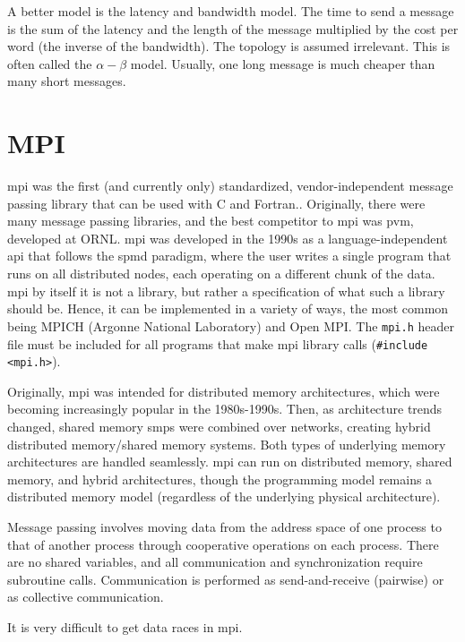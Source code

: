 \documentclass[10pt]{article}
\begin{document}
\begin{flushleft}
A better model is the latency and bandwidth model. The time to send a message is the sum of the latency and the length of the message multiplied by the cost per word (the inverse of the bandwidth). The topology is assumed irrelevant. This is often called the \(\alpha-\beta\) model. Usually, one long message is much cheaper than many short messages. 

\section{MPI}

\gls{mpi} was the first (and currently only) standardized, vendor-independent message passing library that can be used with C and Fortran.. Originally, there were many message passing libraries, and the best competitor to \gls{mpi} was \gls{pvm}, developed at ORNL. \gls{mpi} was developed in the 1990s as a language-independent \gls{api} that follows the \gls{spmd} paradigm, where the user writes a single program that runs on all distributed nodes, each operating on a different chunk of the data. \gls{mpi} by itself it is not a library, but rather a specification of what such a library should be. Hence, it can be implemented in a variety of ways, the most common being MPICH (Argonne National Laboratory) and Open MPI. The {\tt mpi.h} header file must be included for all programs that make \gls{mpi} library calls ({\tt \#include <mpi.h>}).

Originally, \gls{mpi} was intended for distributed memory architectures, which were becoming increasingly popular in the 1980s-1990s. Then, as architecture trends changed, shared memory \gls{smp}s were combined over networks, creating hybrid distributed memory/shared memory systems. Both types of underlying memory architectures are handled seamlessly. \gls{mpi} can run on distributed memory, shared memory, and hybrid architectures, though the programming model remains a distributed memory model (regardless of the underlying physical architecture).

Message passing involves moving data from the address space of one process to that of another process through cooperative operations on each process. There are no shared variables, and all communication and synchronization require subroutine calls. Communication is performed as send-and-receive (pairwise) or as collective communication. 




It is very difficult to get data races in \gls{mpi}.




\end{flushleft}
\end{document}
